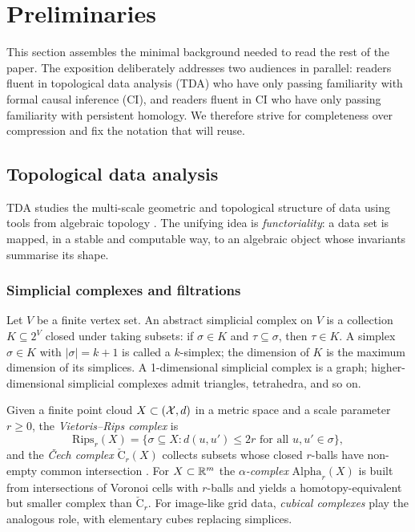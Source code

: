\section{Preliminaries}
\label{sec:preliminaries}

This section assembles the minimal background needed to read the rest of the
paper. The exposition deliberately addresses two audiences in parallel:
readers fluent in topological data analysis (TDA) who have only passing
familiarity with formal causal inference (CI), and readers fluent in CI who
have only passing familiarity with persistent homology. We therefore strive
for completeness over compression and fix the notation that
 will reuse.

\subsection{Topological data analysis}
\label{sec:prelim_tda}

TDA studies the multi-scale geometric and topological structure of data
using tools from algebraic topology
\citep{carlsson2009topology,edelsbrunner2010computational,
chazal2021introduction,wasserman2018topological}. The unifying idea is
\emph{functoriality}: a data set is mapped, in a stable and computable way,
to an algebraic object whose invariants summarise its shape.

\subsubsection{Simplicial complexes and filtrations}

Let $V$ be a finite vertex set. An abstract simplicial complex on $V$ is a
collection $K \subseteq 2^V$ closed under taking subsets: if $\sigma \in K$
and $\tau \subseteq \sigma$, then $\tau \in K$. A simplex
$\sigma \in K$ with $|\sigma| = k+1$ is called a $k$-simplex; the dimension
of $K$ is the maximum dimension of its simplices. A 1-dimensional simplicial
complex is a graph; higher-dimensional simplicial complexes admit triangles,
tetrahedra, and so on.

Given a finite point cloud $X \subset (\mathcal{X}, d)$ in a metric space and a
scale parameter $r \ge 0$, the \emph{Vietoris--Rips complex} is
\begin{equation}
  \mathrm{Rips}_r(X)
  = \bigl\{ \sigma \subseteq X : d(u,u') \le 2r \text{ for all } u, u' \in \sigma \bigr\},
  \label{eq:rips}
\end{equation}
and the \emph{\v{C}ech complex} $\mathrm{\check{C}}_r(X)$ collects subsets
whose closed $r$-balls have non-empty common intersection
\citep{hausmann2016vietoris}. For $X \subset \mathbb{R}^m$ the \emph{$\alpha$-complex}
$\mathrm{Alpha}_r(X)$ is built from intersections of Voronoi cells with
$r$-balls and yields a homotopy-equivalent but smaller complex than
$\mathrm{\check{C}}_r$. For image-like grid data, \emph{cubical complexes}
play the analogous role, with elementary cubes replacing simplices.

